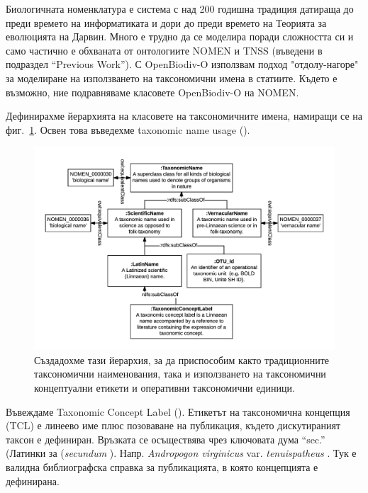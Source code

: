 Биологичната номенклатура е система с над 200 годишна традиция датираща до преди времето на информатиката и дори до преди времето на Теорията за еволюцията на Дарвин. Много е трудно да се моделира поради сложността си и само частично е обхваната от онтологиите NOMEN и TNSS (въведени в подраздел ``Previous Work''). С OpenBiodiv-O използвам подход "отдолу-нагоре" за моделиране на използването на таксономични имена в статиите. Където е възможно, ние подравняваме класовете OpenBiodiv-O на NOMEN.

Дефинирахме йерархията на класовете на таксономичните имена, намиращи се на фиг.~\ref{taxonomic-name-class-hierarchy-diagram}. Освен това въведехме taxonomic name usage ().

\begin{figure}[h!]
  \centering
  \includegraphics[width=\textwidth]{Figures/taxonomic-name-class-hierarchy-diagram}
  \decoRule
  \caption[Taxonomic name class hierarchy diagram.]{Създадохме тази йерархия, за да приспособим както традиционните таксономични наименования, така и използването на таксономични концептуални етикети и оперативни таксономични единици.}
  \label{taxonomic-name-class-hierarchy-diagram}
\end{figure}

Въвеждаме Taxonomic Concept Label (). Етикетът на таксономична концепция (TCL) е линеево име плюс позоваване на публикация, където дискутираният таксон е дефиниран. Връзката се осъществява чрез ключовата дума ``sec.'' (Латинки за (\emph{secundum} \cite{berendsohn_concept_1995}). Напр. \emph{Andropogon virginicus} var. \emph{tenuispatheus} \cite{blomquist_grasses_1948}. Тук \cite{blomquist_grasses_1948} е валидна библиографска справка за публикацията, в която концепцията е дефинирана.

